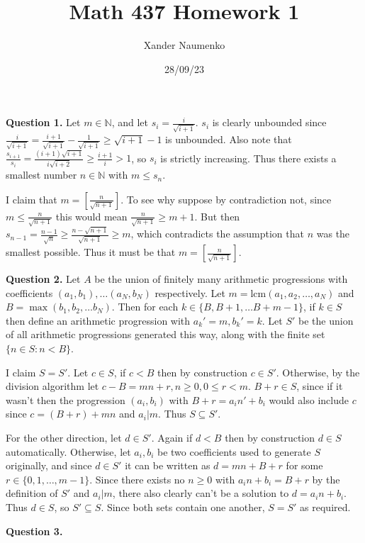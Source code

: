 \documentclass[letterpaper, reqno,11pt]{article}
\begin{document}
\title{Math 437 Homework 1}
\date{28/09/23}
\author{Xander Naumenko}
\maketitle

{\medskip\noindent\bf Question 1.} Let $m\in \mathbb{N}$, and let $s_i=\frac{i}{\sqrt{i+1}}$. $s_i$ is clearly unbounded since $\frac{i}{\sqrt{i+1}}= \frac{i+1}{\sqrt{i+1}}-\frac{1}{\sqrt{i+1}}\geq\sqrt{i+1}-1$ is unbounded. Also note that $\frac{s_{i+1}}{s_i}=\frac{(i+1)\sqrt{i+1}}{i\sqrt{i+2}}\geq \frac{i+1}{i}>1$, so $s_i$ is strictly increasing. Thus there exists a smallest number $n\in\mathbb{N}$ with $m\leq s_n$.

I claim that $m=\left[\frac{n}{\sqrt{n+1}}\right]$. To see why suppose by contradiction not, since $m\leq \frac{n}{\sqrt{n+1}}$ this would mean $\frac{n}{\sqrt{n+1}}\geq m+1$. But then $s_{n-1}=\frac{n-1}{\sqrt{n}}\geq \frac{n-\sqrt{n+1}}{\sqrt{n+1}}\geq m$, which contradicts the assumption that $n$ was the smallest possible. Thus it must be that $m=\left[\frac{n}{\sqrt{n+1}}\right]$.

{\medskip\noindent\bf Question 2.} Let $A$ be the union of finitely many arithmetic progressions with coefficients $(a_1,b_1), \ldots (a_N,b_N)$ respectively. Let $m=\text{lcm}\left( a_1,a_2,\ldots,a_N \right) $ and $B=\max(b_1, b_2, \ldots b_N) $. Then for each $k\in \{B,B+1,\ldots B+m-1\}$, if $k\in S$ then define an arithmetic progression with $a_k'=m,b_k'=k$. Let $S'$ be the union of all arithmetic progressions generated this way, along with the finite set $\{n\in S:n<B\}$.

I claim $S=S'$. Let $c\in S$, if $c< B$ then by construction $c\in S'$. Otherwise, by the division algorithm let $c-B=mn+r, n\geq0, 0\leq r<m$. $B+r\in S$, since if it wasn't then the progression $(a_i,b_i)$ with $B+r = a_i n'+b_i$ would also include $c$ since $c=(B+r)+mn$ and $a_i|m$. Thus $S\subseteq S'$.

For the other direction, let $d\in S'$. Again if $d< B$ then by construction $d\in S$ automatically. Otherwise, let $a_i,b_i$ be two coefficients used to generate $S$ originally, and since $d\in S'$ it can be written as $d=mn+B+r$ for some $r\in \{0,1,\ldots,m-1\}$. Since there exists no $n\geq 0$ with $a_i n+b_i=B+r$ by the definition of $S'$ and $a_i|m$, there also clearly can't be a solution to $d=a_i n+b_i$. Thus $d\in S$, so $S'\subseteq S$. Since both sets contain one another, $S=S'$ as required.

{\medskip\noindent\bf Question 3.} 
\end{document}

